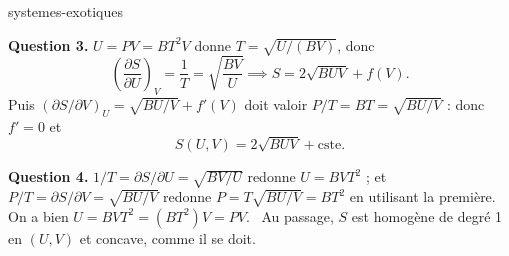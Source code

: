 \begin{exo}{systemes-exotiques}
\begin{solution}
\textbf{Question 3.} $U = PV = BT^2V$ donne $T = \sqrt{U/(BV)}$, donc
\[
\left(\frac{\partial S}{\partial U}\right)_V = \frac{1}{T} = \sqrt{\frac{BV}{U}} \implies S = 2\sqrt{BUV} + f(V).
\]
Puis $\left(\partial S/\partial V\right)_U = \sqrt{BU/V} + f'(V)$ doit valoir $P/T = BT = \sqrt{BU/V}$ : donc $f' = 0$ et
\[
S(U,V) = 2\sqrt{BUV} + \text{cste}.
\]

\textbf{Question 4.} $1/T = \partial S/\partial U = \sqrt{BV/U}$ redonne $U = BVT^2$ ; et $P/T = \partial S/\partial V = \sqrt{BU/V}$ redonne $P = T\sqrt{BU/V} = BT^2$ en utilisant la première. On a bien $U = BVT^2 = (BT^2)V = PV$. \checkmark\ Au passage, $S$ est homogène de degré 1 en $(U,V)$ et concave, comme il se doit.
\end{solution}
\end{exo}

